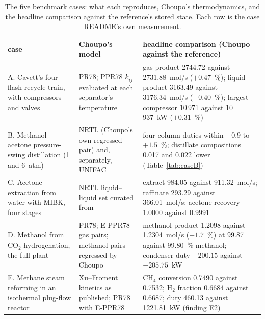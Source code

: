 \documentclass[11pt,a4paper]{article}
\begin{document}
\begin{table}[htbp]
\centering\scriptsize
\caption{The five benchmark cases: what each reproduces, Choupo's
thermodynamics, and the headline comparison against the reference's
stored state.  Each row is the case README's own measurement.}
\label{tab:bench}
\begin{tabularx}{\textwidth}{@{}p{2.7cm}p{3.6cm}X@{}}
\toprule
\textbf{case} & \textbf{Choupo's model} & \textbf{headline comparison (Choupo against the reference)} \\
\midrule
A. Cavett's four-flash recycle train, with compressors and valves
  & PR78; PPR78 $k_{ij}$ evaluated at each separator's temperature
  & gas product 2744.72 against 2731.88~mol/s ($+0.47$~\%); liquid product
    3163.49 against 3176.34~mol/s ($-0.40$~\%); largest compressor
    10\,971 against 10\,937~kW ($+0.31$~\%) \\
B. Methanol--acetone pressure-swing distillation (1 and 6~atm)
  & NRTL (Choupo's own regressed pair) and, separately, UNIFAC
  & four column duties within $-0.9$ to $+1.5$~\%; distillate compositions
    0.017 and 0.022 lower (Table~\ref{tab:caseB}) \\
C. Acetone extraction from water with MIBK, four stages
  & NRTL liquid--liquid set curated from \citet{choi1986}
  & extract 984.05 against 911.32~mol/s; raffinate 293.29 against
    366.01~mol/s; acetone recovery 1.0000 against 0.9991 \\
D. Methanol from CO$_2$ hydrogenation, the full plant
  & PR78; E-PPR78 gas pairs; methanol pairs regressed by Choupo
  & methanol product 1.2098 against 1.2304~mol/s ($-1.7$~\%) at 99.87 against
    99.80~\% methanol; condenser duty $-200.15$ against $-205.75$~kW \\
E. Methane steam reforming in an isothermal plug-flow reactor
  & Xu--Froment kinetics as published; PR78 with E-PPR78
  & CH$_4$ conversion 0.7490 against 0.7532; H$_2$ fraction 0.6684 against
    0.6687; duty 460.13 against 1221.81~kW (finding E2) \\
\bottomrule
\end{tabularx}
\end{table}
\end{document}
